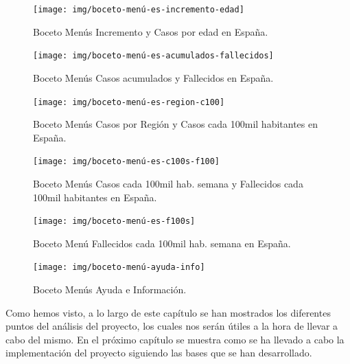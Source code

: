 \begin{figure}[p]
	\centering
	\texttt{[image: img/boceto-menú-es-incremento-edad]}
	\caption{Boceto Menús Incremento y Casos por edad en España.}
	\label{fig:boceto7}
\end{figure}

\begin{figure}[p]
	\centering
	\texttt{[image: img/boceto-menú-es-acumulados-fallecidos]}
	\caption{Boceto Menús Casos acumulados y Fallecidos en España.}
	\label{fig:boceto8}
\end{figure}

\begin{figure}[p]
	\centering
	\texttt{[image: img/boceto-menú-es-region-c100]}
	\caption{Boceto Menús Casos por Región y Casos cada 100mil habitantes en España.}
	\label{fig:boceto9}
\end{figure}

\begin{figure}[p]
	\centering
	\texttt{[image: img/boceto-menú-es-c100s-f100]}
	\caption{Boceto Menús Casos cada 100mil hab. semana y Fallecidos cada 100mil habitantes en España.}
	\label{fig:boceto10}
\end{figure}

\begin{figure}[p]
	\centering
	\texttt{[image: img/boceto-menú-es-f100s]}
	\caption{Boceto Menú Fallecidos cada 100mil hab. semana en España.}
	\label{fig:boceto11}
\end{figure}

\begin{figure}[p]
	\centering
	\texttt{[image: img/boceto-menú-ayuda-info]}
	\caption{Boceto Menús Ayuda e Información.}
	\label{fig:boceto12}
\end{figure}

Como hemos visto, a lo largo de este capítulo se han mostrados los diferentes puntos del análisis del proyecto, los cuales nos serán útiles a la hora de llevar a cabo del mismo. En el próximo capítulo se muestra como se ha llevado a cabo la implementación del proyecto siguiendo las bases que se han desarrollado.